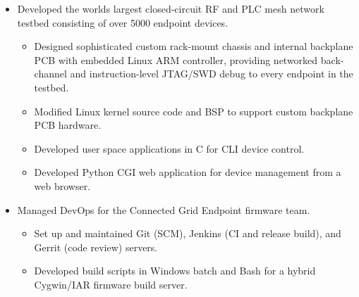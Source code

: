 \documentclass[11pt,a4paper]{moderncv}
\begin{document}
{\begin{itemize}
\begin{itemize}
    \end{itemize}
  \item Developed the worlds largest closed-circuit RF and PLC mesh network testbed consisting of over 5000 endpoint devices.
    \begin{itemize}
    \item Designed sophisticated custom rack-mount chassis and internal backplane PCB with embedded Linux ARM controller, providing networked back-channel and instruction-level JTAG/SWD debug to every endpoint in the testbed.
    \item Modified Linux kernel source code and BSP to support custom backplane PCB hardware.
    \item Developed user space applications in C for CLI device control.
    \item Developed Python CGI web application for device management from a web browser.
    \end{itemize}
  \item Managed DevOps for the Connected Grid Endpoint firmware team.
    \begin{itemize}
    \item Set up and maintained Git (SCM), Jenkins (CI and release build), and Gerrit (code review) servers.
    \item Developed build scripts in Windows batch and Bash for a hybrid Cygwin/IAR firmware build server.
    \end{itemize}
  \end{itemize}
}
\end{document}
